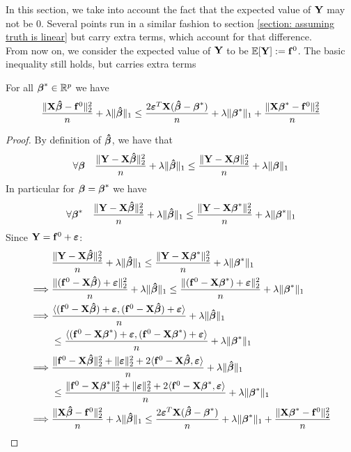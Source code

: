 In this section, we take into account the fact that the expected value of \(\Y\) may not be 0. Several points run in a similar fashion to section \ref{section: assuming truth is linear} but carry extra terms, which account for that difference. \\
From now on, we consider the expected value of \(\Y\) to be \(\mathbb{E} [\mathbf{Y}] :=\f^{0}\). The basic inequality still holds, but carries extra terms
\begin{lemma}
    For all \(\bta^* \in \R^p\) we have
    \begin{equation}
        \frac{\|\X \btahat - \f^0 \|_{2}^{2}}{n} + \lambda\| \btahat \|_{1} \leq \frac{2 \eps^T \X (\btahat - \bta^*)}{n} + \lambda \| \bta^*\|_{1} + \frac{\|\X \bta^* - \f^0\|_{2}^{2}}{n}
    \end{equation}
\end{lemma}
\begin{proof}
    By definition of \(\btahat\), we have that
    \[
        \forall \bta \quad \frac{\| \Y -\X \btahat \|_{2}^{2}}{n} + \lambda \| \btahat \|_{1} \leq \frac{\|\Y-\X \bta \|_{2}^{2}}{n}+\lambda \| \bta \|_{1}
    \]
    In particular for $\bta = \bta^*$ we have
    \[
        \forall \bta^* \quad \frac{\| \Y -\X \btahat \|_{2}^{2}}{n} + \lambda \| \btahat \|_{1} \leq \frac{\|\Y-\X \bta^* \|_{2}^{2}}{n}+\lambda \| \bta^* \|_{1}
    \]
    Since $\Y = \f^0 + \eps$:
    \begin{align*}
                 & \frac{\|\Y  - \X \btahat \|_{2}^{2}}{n} + \lambda \| \btahat\|_{1} \leq \frac{\| \Y  - \X \bta^* \|_2^2}{n}+\lambda\|\bta^{*}\|_{1}                                                       \\
        \implies &
        \frac{\| (\f^0 - \X \btahat ) + \eps \|_{2}^{2}}{n} + \lambda\| \btahat \|_{1} \leq \frac{ \| (\f^0 - \X \bta^*) + \eps \|_{2}^{2}}{n}+\lambda \| \bta^*\|_{1}                       \\
        \implies &
        \frac{\langle (\f^0 - \X \btahat ) + \eps, (\f^0 - \X \btahat ) + \eps \rangle}{n} + \lambda\| \btahat \|_{1}                                                                        \\
                 & \leq \frac{ \langle (\f^0 - \X \bta^*) + \eps, (\f^0 - \X \bta^*) + \eps \rangle}{n}+\lambda \| \bta^*\|_{1}                                                              \\
        \implies &
        \frac{\|\f^0 - \X \btahat \|_{2}^{2} + \| \eps \|_{2}^{2} + 2\langle \f^0 - \X \btahat, \eps \rangle}{n} + \lambda\| \btahat \|_{1}                                                  \\
                 & \leq \frac{\|\f^0 - \X \bta^* \|_{2}^{2} + \| \eps \|_{2}^{2} + 2\langle \f^0 - \X \bta^*, \eps \rangle}{n}+\lambda \| \bta^*\|_{1}                                       \\
        \implies &
        \frac{\|\X \btahat - \f^0 \|_{2}^{2}}{n} + \lambda\| \btahat \|_{1} \leq \frac{2 \eps^T \X (\btahat - \bta^*)}{n} + \lambda \| \bta^*\|_{1} + \frac{\|\X \bta^* - \f^0\|_{2}^{2}}{n} \\
    \end{align*}
\end{proof}
